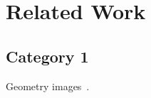 \section{Related Work}
\label{sec:related}
\subsection{Category 1}
Geometry images~\cite{gu2002geometry}.